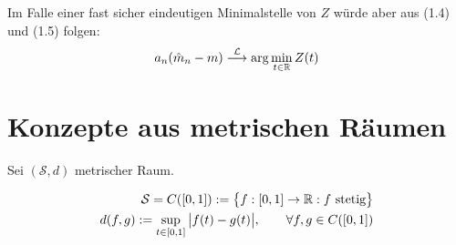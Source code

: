 Im Falle einer fast sicher eindeutigen Minimalstelle von $Z$ würde aber aus (1.4) und (1.5) folgen:
\begin{align*}
a_n(\hat{m}_n-m)
\stackrel{\mathcal{L}}{\longrightarrow}
\arg\min\limits_{t\in\mathbb{R}} Z(t)
\end{align*}


\section{Konzepte aus metrischen Räumen}
Sei $(\mathcal{S},d)$ metrischer Raum.

\begin{beispiel} %
\begin{align*}
\mathcal{S}=C([0,1]):=\big\lbrace f:[0,1]\to\mathbb{R}: f\text{ stetig}\big\rbrace\\
d(f,g):=\sup\limits_{t\in[0,1]}\big|f(t)-g(t)\big|,\qquad\forall f,g\in C([0,1])
\end{align*}
\end{beispiel}

